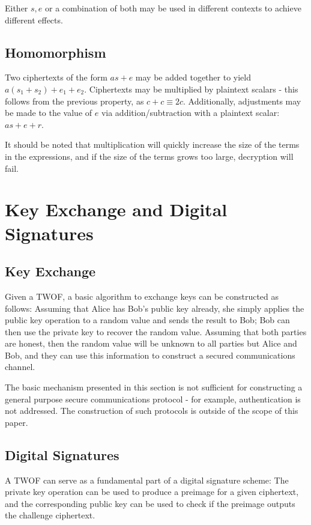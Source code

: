 \documentclass[preprint]{iacrtrans}
\begin{document}
Either $s, e$ or a combination of both may be used in different contexts to achieve different effects.

\subsection{Homomorphism}
Two ciphertexts of the form $a s + e$ may be added together to yield $a (s_1 + s_2) + e_1 + e_2$. 
Ciphertexts may be multiplied by plaintext scalars - this follows from the previous property, as $c + c \equiv 2c$.
Additionally, adjustments may be made to the value of $e$ via addition/subtraction with a plaintext scalar: $a s + e + r$.

It should be noted that multiplication will quickly increase the size of the terms in the expressions, and if the size of the terms grows too large, decryption will fail.

\section{Key Exchange and Digital Signatures}
\subsection{Key Exchange}
Given a TWOF, a basic algorithm to exchange keys can be constructed as follows: Assuming that Alice has Bob's public key already, she simply applies the public key operation to a random value and sends the result to Bob; Bob can then use the private key to recover the random value. Assuming that both parties are honest, then the random value will be unknown to all parties but Alice and Bob, and they can use this information to construct a secured communications channel.

The basic mechanism presented in this section is not sufficient for constructing a general purpose secure communications protocol - for example, authentication is not addressed. The construction of such protocols is outside of the scope of this paper. 

\subsection{Digital Signatures}
A TWOF can serve as a fundamental part of a digital signature scheme: The private key operation can be used to produce a preimage for a given ciphertext, and the corresponding public key can be used to check if the preimage outputs the challenge ciphertext. 
\end{document}
